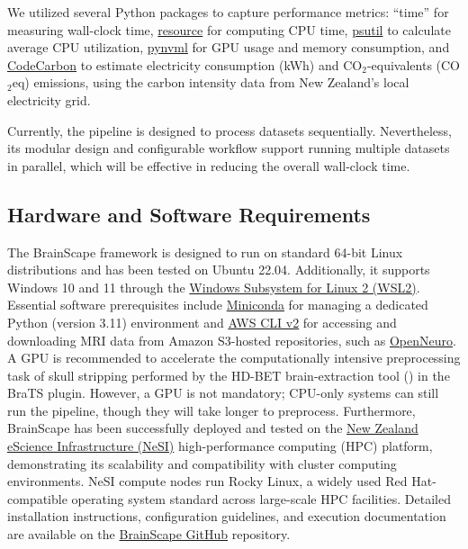 We utilized several Python packages to capture performance metrics: 
``time'' for measuring wall-clock time, 
\href{https://docs.python.org/3/library/resource.html}{resource} for computing CPU time,
\href{https://pypi.org/project/psutil/}{psutil} to calculate average CPU utilization, 
\href{https://pypi.org/project/pynvml/}{pynvml} for GPU usage and memory consumption, and 
\href{https://pypi.org/project/codecarbon/}{CodeCarbon} to estimate electricity consumption (kWh) and CO$_2$-equivalents (CO$_2$eq) emissions, 
using the carbon intensity data from New Zealand's local electricity grid.

Currently, the pipeline is designed to process datasets sequentially. 
Nevertheless, its modular design and configurable workflow support running multiple datasets in parallel, 
which will be effective in reducing the overall wall-clock time.


\subsection{Hardware and Software Requirements}

The BrainScape framework is designed to run on standard 64-bit Linux distributions and has been tested on Ubuntu 22.04. 
Additionally, it supports Windows 10 and 11 through the \href{https://learn.microsoft.com/en-gb/windows/wsl}{Windows Subsystem for Linux 2 (WSL2)}.
Essential software prerequisites include \href{https://www.anaconda.com/docs/getting-started/miniconda/main}{Miniconda} for managing 
a dedicated Python (version 3.11) environment  
and \href{https://docs.aws.amazon.com/cli/latest/userguide/getting-started-install.html}{AWS CLI v2} for accessing and 
downloading MRI data from Amazon S3-hosted repositories, such as \href{https://openneuro.org/}{OpenNeuro}. 
A GPU is recommended to accelerate the computationally intensive preprocessing task of skull stripping 
performed by the HD-BET brain-extraction tool (\cite{isensee2019automated}) in the BraTS plugin. 
However, a GPU is not mandatory; CPU-only systems can still run the pipeline, though they will take longer to preprocess.
Furthermore, BrainScape has been successfully deployed and tested on the 
\href{https://www.nesi.org.nz/}{New Zealand eScience Infrastructure (NeSI)} 
high-performance computing (HPC) platform, demonstrating its scalability and compatibility with cluster computing environments. 
NeSI compute nodes run Rocky Linux, a widely used Red Hat-compatible operating system standard across large-scale HPC facilities. 
Detailed installation instructions, configuration guidelines, and execution documentation are available on
the \href{https://github.com/yasinzaii/BrainScape}{BrainScape GitHub} repository.

